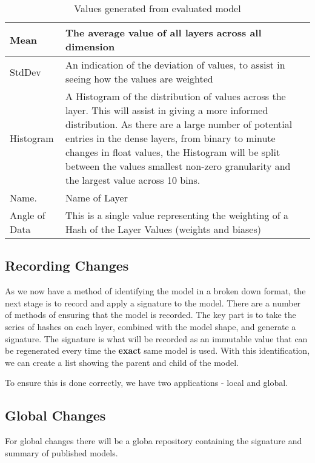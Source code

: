 \begin{table}[h]
    \caption{Values generated from evaluated model}
    \setlength\tabcolsep{0pt} %
    \begin{tabular}{@{} |p{2cm}|p{6.5cm}| @{}}
        Mean    & The average value of all layers across all dimension \\ \hline 
        StdDev  & An indication of the deviation of values, to assist in seeing how the values are weighted \\ \hline
        Histogram & A Histogram of the distribution of values across the layer. This will assist in giving a more informed distribution. As there are a large number of potential entries in the dense layers, from binary to minute changes in float values, the Histogram will be split between the values smallest non-zero granularity and the largest value across 10 bins. \\ \hline
        Name.   & Name of Layer \\ \hline
        Angle of Data & This is a single value representing the weighting of a Hash of the Layer Values (weights and biases) \\ 
    \end{tabular}
\end{table}

\subsection{Recording Changes}
As we now have a method of identifying the model in a broken down format, the next stage is to record and apply a signature to the model. There are a number of methods of ensuring that the model is recorded. The key part is to take the series of hashes on each layer, combined with the model shape, and generate a signature. The signature is what will be recorded as an immutable value that can be regenerated every time the \textbf{exact} same model is used. With this identification, we can create a list showing the parent and child of the model.

To ensure this is done correctly, we have two applications - local and global.
\subsection{Global Changes}
For global changes there will be a globa repository containing the signature and summary of published models. 

